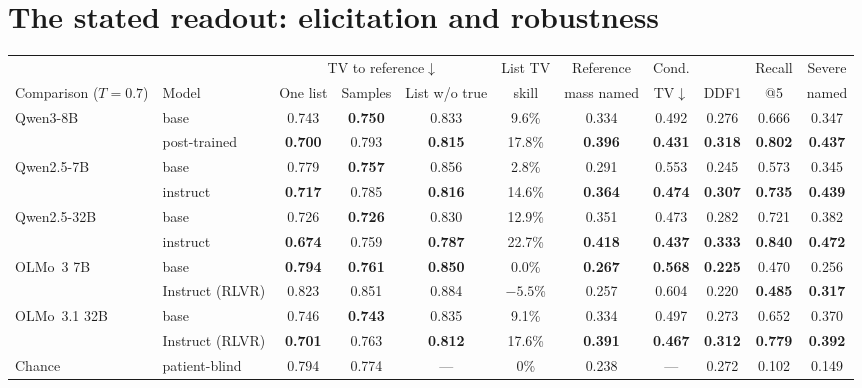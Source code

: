 \documentclass[wcp]{jmlr}
\begin{document}
\section{The stated readout: elicitation and robustness}\label{app:stated}
\begin{table}[t]
\centering\small
\begin{adjustbox}{max width=\linewidth}
\begin{tabular}{llccccccccc}
\toprule
 & & \multicolumn{3}{c}{TV to reference$\downarrow$} & List TV & Reference & Cond. & & Recall & Severe \\
Comparison ($T{=}0.7$) & Model & One list & Samples & List w/o true & skill & mass named & TV$\downarrow$ & DDF1 & @5 & named \\
\midrule
Qwen3-8B & base & 0.743 & \textbf{0.750} & 0.833 & 9.6\% & 0.334 & 0.492 & 0.276 & 0.666 & 0.347 \\
 & post-trained & \textbf{0.700} & 0.793 & \textbf{0.815} & 17.8\% & \textbf{0.396} & \textbf{0.431} & \textbf{0.318} & \textbf{0.802} & \textbf{0.437} \\
Qwen2.5-7B & base & 0.779 & \textbf{0.757} & 0.856 & 2.8\% & 0.291 & 0.553 & 0.245 & 0.573 & 0.345 \\
 & instruct & \textbf{0.717} & 0.785 & \textbf{0.816} & 14.6\% & \textbf{0.364} & \textbf{0.474} & \textbf{0.307} & \textbf{0.735} & \textbf{0.439} \\
Qwen2.5-32B & base & 0.726 & \textbf{0.726} & 0.830 & 12.9\% & 0.351 & 0.473 & 0.282 & 0.721 & 0.382 \\
 & instruct & \textbf{0.674} & 0.759 & \textbf{0.787} & 22.7\% & \textbf{0.418} & \textbf{0.437} & \textbf{0.333} & \textbf{0.840} & \textbf{0.472} \\
OLMo~3 7B & base & \textbf{0.794} & \textbf{0.761} & \textbf{0.850} & 0.0\% & \textbf{0.267} & \textbf{0.568} & \textbf{0.225} & 0.470 & 0.256 \\
 & Instruct (RLVR) & 0.823 & 0.851 & 0.884 & $-5.5$\% & 0.257 & 0.604 & 0.220 & \textbf{0.485} & \textbf{0.317} \\
OLMo~3.1 32B & base & 0.746 & \textbf{0.743} & 0.835 & 9.1\% & 0.334 & 0.497 & 0.273 & 0.652 & 0.370 \\
 & Instruct (RLVR) & \textbf{0.701} & 0.763 & \textbf{0.812} & 17.6\% & \textbf{0.391} & \textbf{0.467} & \textbf{0.312} & \textbf{0.779} & \textbf{0.392} \\
\midrule
Chance & patient-blind & 0.794 & 0.774 & --- & 0\% & 0.238 & --- & 0.272 & 0.102 & 0.149 \\

\end{tabular}
\end{adjustbox}
\end{table}
\end{document}
